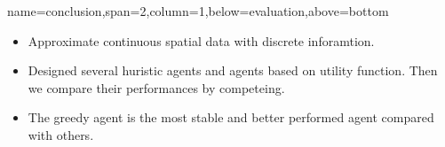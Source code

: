 \documentclass[a1paper,portrait]{baposter}
\begin{document}
\begin{poster}
{name=conclusion,span=2,column=1,below=evaluation,above=bottom}{
\vspace{1em}
\begin{itemize} \itemsep0pt \parskip0pt 
  \item Approximate continuous spatial data with discrete inforamtion.
  \item Designed several huristic agents and agents based on utility function.
 Then we compare their performances by competeing.
  \item The greedy agent is the most stable and better performed agent compared with others.
\end{itemize}
}

\end{poster}
\end{document}
